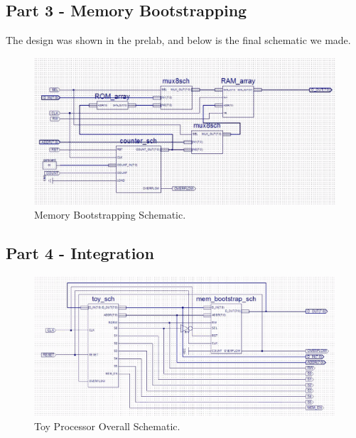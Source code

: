 \documentclass[12pt]{article}
\begin{document}
		\subsection{Part 3 - Memory Bootstrapping}
		The design was shown in the prelab, and below is the final schematic we made.

		\begin{figure}[h]
			\includegraphics[scale=.5]{mem.png}
			\caption{Memory Bootstrapping Schematic.}
		\end{figure}



		\subsection{Part 4 - Integration}

		\begin{figure}[h]
			\includegraphics[scale=.4]{toy.png}
			\caption{Toy Processor Overall Schematic.}
		\end{figure}
\end{document}
